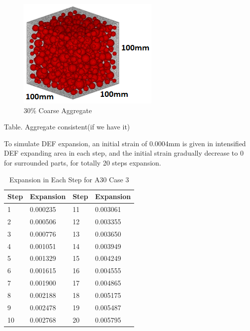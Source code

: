 
  \begin{figure}[ht]
  \centering
  \includegraphics[width=.3\linewidth]{Files/Aggregate/A30.png}
    \caption{30\% Coarse Aggregate}
    \label{fig:A30_model}
  \end{figure}

Table. Aggregate consistent(if we have it)

To simulate DEF expansion, an initial strain of 0.0004mm is given in intensified DEF expanding area in each step, and the initial strain gradually decrease to 0 for surrounded parts, for totally 20 steps expansion.


  \begin{table}[ht]
  \centering
  \begin{tabular}{ ||p{3cm}|p{3cm}||p{3cm}|p{3cm}|| }
  \hline
   Step &  Expansion & Step & Expansion \\
   \hline\hline
    1 & 0.000235  & 11 & 0.003061 \\
    2 & 0.000506  & 12 & 0.003355 \\
    3 & 0.000776  & 13 & 0.003650 \\
    4 & 0.001051  & 14 & 0.003949 \\
    5 & 0.001329  & 15 & 0.004249 \\
    6 & 0.001615  & 16 & 0.004555 \\
    7 & 0.001900  & 17 & 0.004865 \\
    8 & 0.002188  & 18 & 0.005175 \\
    9 & 0.002478  & 19 & 0.005487 \\
    10 & 0.002768 & 20  & 0.005795 \\
    \hline
    \end{tabular}
  \caption{Expansion in Each Step for A30 Case 3}
  \label{table:A30X0C_3_EXP}
  \end{table}

